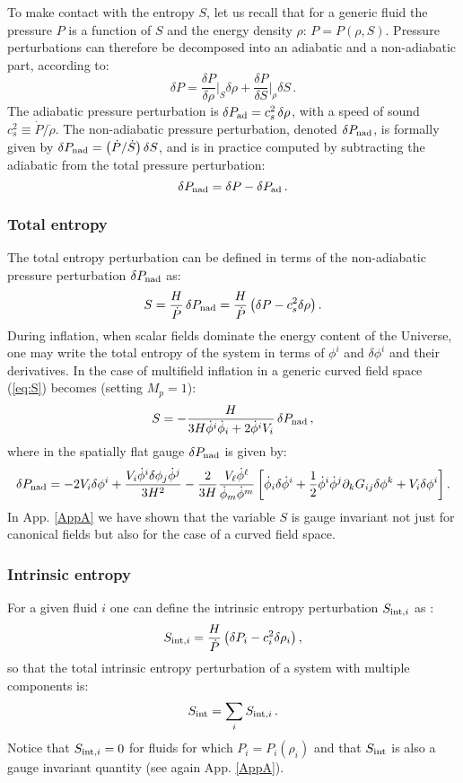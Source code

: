 \documentclass[a4paper,11pt]{article}
\def\be{\begin{equation}}
\def\ee{\end{equation}}
\begin{document}
To make contact with the entropy $S$, let us recall that for a generic fluid the pressure $P$ is a function of $S$ and the energy density $\rho$: $P=P(\rho,S)$. Pressure perturbations can therefore be decomposed into an adiabatic and a non-adiabatic part, according to:
\be
\delta P= \frac{\delta P}{\delta \rho}\Big |_S \delta \rho+ \frac{\delta P}{\delta S}\Big|_\rho \delta S\,.
\ee
The adiabatic pressure perturbation is $\delta P_{\rm ad}=c_s^2\, \delta\rho$, with a speed of sound $c_s^2\equiv \dot{P}/\dot{\rho}$. The non-adiabatic pressure perturbation, denoted $\delta P_{\rm nad}$, is formally given by $\delta P_{\rm nad}=\left(\dot{P}/\dot{S}\right)\delta S$, and is in practice computed by subtracting the adiabatic from the total pressure perturbation: 
\be
\delta P_{\rm nad}=\delta P- \delta P_{\rm ad}\,.
\label{eq:Pnad}
\ee

\subsubsection*{Total entropy}

The total entropy perturbation can be defined in terms of the non-adiabatic pressure perturbation $\delta P_{\rm nad}$ as:
\be
S=\frac{H}{\dot{P}}\,\delta P_{\rm nad}=\frac{H}{\dot{P}}\left(\delta P- c_s^2 \delta \rho\right).
\label{eq:S}
\ee
During inflation, when scalar fields dominate the energy content of the Universe, one may write the total entropy of the system in terms of $\phi^i$ and $\delta\phi^i$ and their derivatives. In the case of multifield inflation in a generic curved field space (\ref{eq:S}) becomes (setting $M_p=1$):
\be 
S=-\frac{H}{3H\dot\phi^i\dot\phi_i+2\dot\phi^i V_i}\,\delta P_{\rm nad}\,,
\label{TotS}
\ee
where in the spatially flat gauge $\delta P_{\rm nad}$ is given by:
\be
\delta P_{\rm nad}=-2 V_i \delta \phi^i + \frac{V_i \dot{\phi}^i \delta\phi_j \dot{\phi}^j}{3H^2} -\frac{2}{3H}\frac{V_\ell \dot{\phi}^\ell}{\dot{\phi}_m \dot{\phi}^m}\left[\dot{\phi}_i \delta\dot{\phi}^i +\frac12 \dot{\phi}^i \dot{\phi}^j \partial_k G_{ij} \delta \phi^k +V_i \delta\phi^i \right].
\ee
In App. \ref{AppA} we have shown that the variable $S$ is gauge invariant not just for canonical fields but also for the case of a curved field space.

\subsubsection*{Intrinsic entropy}

For a given fluid $i$ one can define the intrinsic entropy perturbation $S_{{\rm int},i}$ as \cite{Malik:2004tf}:
\be
S_{{\rm int},i}=\frac{H}{\dot{P}}\left(\delta P_i- c_i^2 \delta \rho_i\right),
\label{eq:Sint}
\ee
so that the total intrinsic entropy perturbation of a system with multiple components is:
\be
S_{\rm int}=\sum_i S_{{\rm int},i}\,.
\label{eq:Srel0}
\ee
Notice that $S_{{\rm int},i}=0$ for fluids for which $P_i=P_i(\rho_i)$ and that $S_{\rm int}$ is also a gauge invariant quantity (see again App. \ref{AppA}).
 
\end{document}
